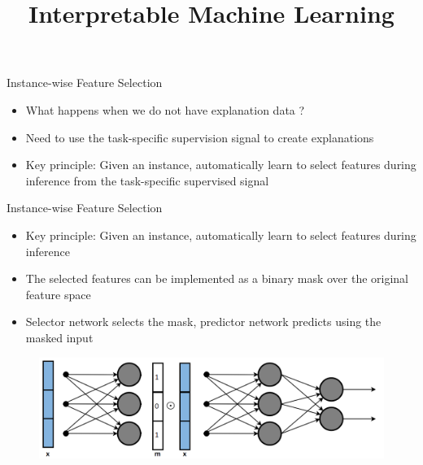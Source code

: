 \documentclass[11pt,compress,t,notes=noshow, aspectratio=169, xcolor=table]{beamer}
\title{Interpretable Machine Learning}
\date{}
\begin{document}
	\graphicspath{ {./figure/} }

\newcommand{\titlefigure}{figure/bild2}
\newcommand{\learninggoals}{
\item TBA
\item TBA
\item TBA}


 
\begin{frame}[c]{Instance-wise Feature Selection}
    \begin{itemize}
        \item What happens when we do not have explanation data ?
        \bigskip
        \item Need to use the task-specific supervision signal to create explanations
        \bigskip
        \item Key principle: Given an instance, automatically learn to select features during inference
from the task-specific supervised signal
    \end{itemize}
\end{frame}	
	
\begin{frame}{Instance-wise Feature Selection}
    \begin{itemize}
        \item Key principle: Given an instance, automatically learn to select features during inference
        \item The selected features can be implemented as a binary mask over the original feature
space
\item Selector network selects the mask, predictor network predicts using the masked input
    \end{itemize}
    \begin{figure}
        \centering
        \includegraphics[scale=.45]{bild16}
    \end{figure}
\end{frame}
	
\end{document}
